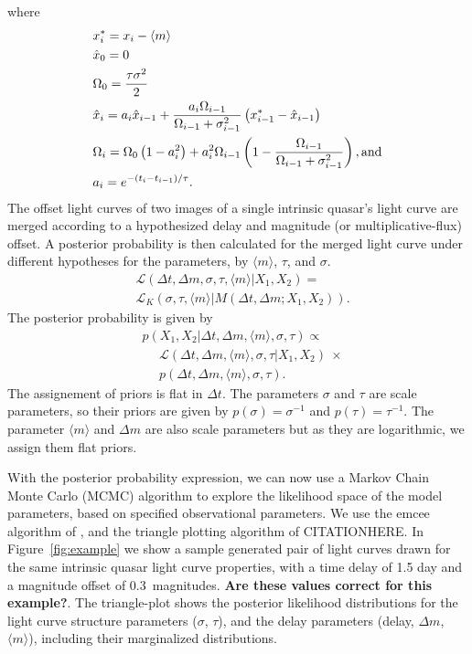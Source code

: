 \documentclass{emulateapj}
\begin{document}
where 
\begin{alignat}{1}
& x_{i}^{*} = x_i-\langle m \rangle \nonumber\\
& \hat{x}_0 = 0   \nonumber\\
& \Omega_{0}=\frac{\tau\sigma^2}{2} \nonumber\\
& \hat{x}_i = a_i\hat{x}_{i-1} + \frac{a_i\Omega_{i-1}}{\Omega_{i-1}+\sigma^2_{i-1}} \left(x^{*}_{i-1}-\hat{x}_{i-1}\right) \nonumber\\
& \Omega_{i}=\Omega_{0}\left(1-a_{i}^2\right) +
a_{i}^2\Omega_{i-1}\left(1-\frac{\Omega_{i-1}}{\Omega_{i-1}+\sigma_{i-1}^2}\right),
{\rm and} \nonumber\\
& a_i = e^{-\left(t_i-t_{i-1}\right)/\tau}. \nonumber
\end{alignat}
The offset light curves of two images of a single intrinsic quasar's 
light curve are merged according to a hypothesized delay and magnitude
(or multiplicative-flux) offset. A posterior probability is then
calculated for the merged light curve under different hypotheses for
the parameters, by $\langle m\rangle$, $\tau$, and $\sigma$.
\begin{align}
& \mathcal L (\Delta t, \Delta m, \sigma, \tau, \langle m \rangle | X_1, X_2)  = \nonumber \\
& \mathcal{L}_{K} \left( \sigma, \tau, \langle m \rangle  | M(\Delta
  t,\Delta m ; X_1, X_2) \right). 
\end{align}
The posterior probability is given by
\begin{align}
& p(X_1, X_2 | \Delta t, \Delta m, \langle m \rangle, \sigma,\tau) \propto \nonumber \\
&  \ \ \ \ \ \ \mathcal{L}(\Delta t, \Delta m, \langle m \rangle,
\sigma,\tau | X_1, X_2)\ \times\nonumber\\
&  \ \ \ \ \ \   p(\Delta t, \Delta m, \langle m \rangle,
\sigma,\tau). 
\end{align}
The assignement of priors is flat in $\Delta t$. The parameters
$\sigma$ and $\tau$ are scale parameters, so their priors are given by
$p(\sigma)=\sigma^{-1}$ and $p(\tau)=\tau^{-1}$. The parameter
$\langle m \rangle$ and $\Delta m$ are also scale parameters but as
they are logarithmic, we assign them flat priors.  

With the posterior probability expression, we can now use a Markov
Chain Monte Carlo (MCMC) algorithm to explore the likelihood space of
the model parameters, based on specified observational parameters. We
use the emcee algorithm of \citet{Foreman-Mackey2013a}, and the
triangle plotting algorithm of CITATIONHERE. In
Figure~\ref{fig:example} we show a sample generated pair of light
curves drawn for the same intrinsic quasar light curve properties,
with a time delay of 1.5 day and a magnitude offset of
0.3~magnitudes. {\bf Are these values correct for this example?}.  The
triangle-plot shows the posterior likelihood distributions for the
light curve structure parameters ($\sigma$, $\tau$), and the delay
parameters (delay, $\Delta m$, $\langle m\rangle$), including their
marginalized distributions. 
\end{document}
